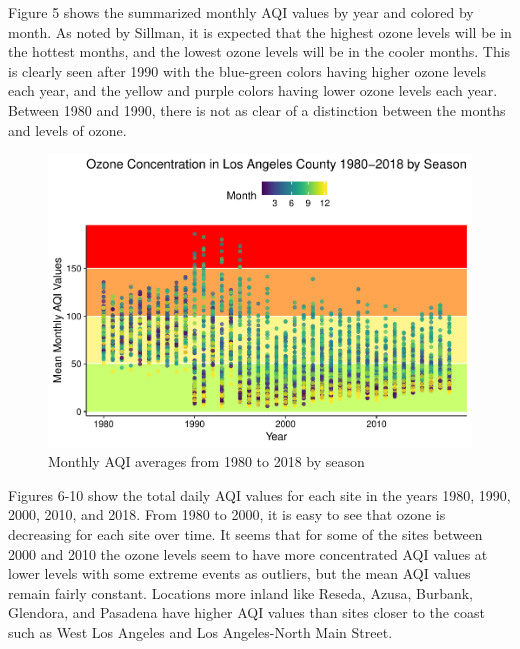 \documentclass[12pt,]{article}
\begin{document}
Figure 5 shows the summarized monthly AQI values by year and colored by
month. As noted by Sillman, it is expected that the highest ozone levels
will be in the hottest months, and the lowest ozone levels will be in
the cooler months. This is clearly seen after 1990 with the blue-green
colors having higher ozone levels each year, and the yellow and purple
colors having lower ozone levels each year. Between 1980 and 1990, there
is not as clear of a distinction between the months and levels of ozone.

\begin{figure}
\centering
\includegraphics{Roth_ENV872_Project_files/figure-latex/plot data with seasons-1.pdf}
\caption{Monthly AQI averages from 1980 to 2018 by season}
\end{figure}

Figures 6-10 show the total daily AQI values for each site in the years
1980, 1990, 2000, 2010, and 2018. From 1980 to 2000, it is easy to see
that ozone is decreasing for each site over time. It seems that for some
of the sites between 2000 and 2010 the ozone levels seem to have more
concentrated AQI values at lower levels with some extreme events as
outliers, but the mean AQI values remain fairly constant. Locations more
inland like Reseda, Azusa, Burbank, Glendora, and Pasadena have higher
AQI values than sites closer to the coast such as West Los Angeles and
Los Angeles-North Main Street.
\end{document}
